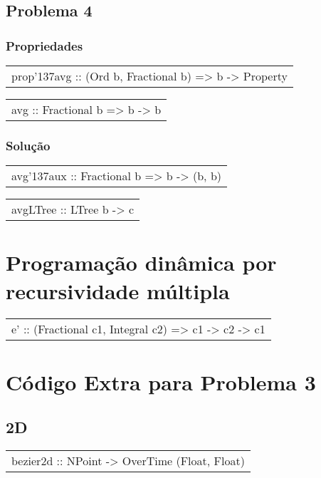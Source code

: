 \subsection{Problema 4}
\subsubsection{Propriedades}
\begin{haddockdesc}
\item[\begin{tabular}{@{}l}
prop{\char '137}avg :: (Ord b, Fractional b) => {\char 91}b{\char 93} -> Property
\end{tabular}]
\item[\begin{tabular}{@{}l}
avg :: Fractional b => {\char 91}b{\char 93} -> b
\end{tabular}]
\end{haddockdesc}
\subsubsection{Solução}
\begin{haddockdesc}
\item[\begin{tabular}{@{}l}
avg{\char '137}aux :: Fractional b => {\char 91}b{\char 93} -> (b, b)
\end{tabular}]
\item[\begin{tabular}{@{}l}
avgLTree :: LTree b -> c
\end{tabular}]
\end{haddockdesc}
\section{Programação dinâmica por recursividade múltipla}
\begin{haddockdesc}
\item[\begin{tabular}{@{}l}
e' :: (Fractional c1, Integral c2) => c1 -> c2 -> c1
\end{tabular}]
\end{haddockdesc}
\section{Código Extra para Problema 3}
\subsection{2D}
\begin{haddockdesc}
\item[\begin{tabular}{@{}l}
bezier2d :: {\char 91}NPoint{\char 93} -> OverTime (Float, Float)
\end{tabular}]
\end{haddockdesc}
